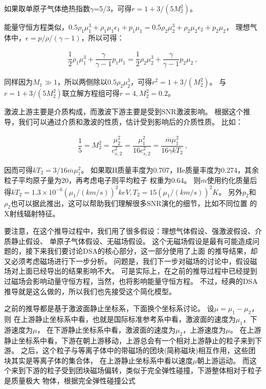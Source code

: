 如果取单原子气体绝热指数$\gamma$=5/3，可得$r=1+3/(5 M_{2}^{2})$。

能量守恒方程类似，$0.5\rho_1\mu_1^3+\rho_1\mu_1\epsilon_1+p_1\mu_1=
0.5\rho_2\mu_2^3+\rho_2\mu_2\epsilon_2+p_2\mu_2$，
理想气体中，$\epsilon=p/\rho/(\gamma-1)$，所以可得：

\begin{equation}
    \begin{aligned}
      \dfrac{1}{2}\rho_1\mu_1^3+\dfrac{\gamma}{\gamma-1}p_1\mu_1=
      \dfrac{1}{2}\rho_2\mu_2^3+\dfrac{\gamma}{\gamma-1}p_2\mu_2\ ,
    \end{aligned}
\end{equation}

同样因为$M_1\gg 1$，所以两侧除以$0.5\rho_2\mu_2^3$，可得$r^2=1+3/(M_{2}^{2})$。
与$r=1+3/(5 M_{2}^{2})$联立解方程组可得$r=4, M_{2}^{2}=0.2$。

激波上游主要是介质构成，而激波下游主要是受到SNR激波影响。
根据这个推导，我们可以通过介质和激波的性质，估计受到影响后的介质性质。
比如：

\begin{equation}
    \begin{aligned}
      \dfrac{1}{5}=M_{2}^{2}=\dfrac{\mu_{2}^{2}}{c_{s, 2}^{2}}=
      \dfrac{\mu_{1}^{2}}{16 c_{s, 2}^{2}}=\dfrac{\overline{m} \mu_{1}^{2}}{16 \gamma k T_{2}}\ ,
    \end{aligned}
\end{equation}

因而可得$k T_{2}=3/16 \overline{m} \mu_{1}^{2}$。
如果取H质量丰度为0.707，He质量丰度为0.274，其余粒子平均原子量为20，再考虑电子则平均粒子
权重为0.64。
则$\overline{m}$使用约化质量后得$k T_{2}=1.3 \times 10^{-6}(\mu_1/(km/s))^2 keV, T_2 =
15 (\mu_1/(km/s))^2 K$。
另外$p_2$和$\rho_2$也可以据此推出，这可以帮助我们理解很多SNR演化的细节，比如不同位置
的X射线辐射特征。

要注意，在这个推导过程中，我们用了很多假设：理想气体假设、强激波假设、介质静止假设、
单原子气体假设、无磁场假设。
这个无磁场假设是最有可能造成问题的，接下来我们要讨论DSA的核心部分，这一部分使用了上面
的推导结果，却又必须考虑磁场进行下一步分析。
问题是，我们下一步对磁场的讨论中，假设磁场对上面已经导出的结果影响不大。
可是实际上，在之前的推导过程中已经提到过磁场会影响动量守恒方程，当然，也将影响能量守恒方程。
不过，经典的DSA推导就是这么做的，所以我们也先接受这个简化模型。

之前的推导都是基于激波面静止坐标系，下面换个坐标系讨论。
设$\mu=\mu_1-\mu_2$，则
在上游静止坐标系中看，也就是国际标准参考系中看，激波面的速度为$\mu_1$，下游速度为$\mu$，
在下游静止坐标系中看，激波面的速度为$\mu_2$，上游速度为$\mu$。
在上游静止坐标系中看，下游在朝上游移动，上游总会有一个相对上游静止的粒子来到下游。
之后，这个粒子与等离子体中的带磁场的团块(简称磁块)相互作用，这些团块其实是等离子体的集合体，
在上游静止坐标系中看以速度$\mu$朝上游运动。
而这个来到下游的粒子受到团块磁场偏转，类似于完全弹性碰撞，下游整体相对于粒子是质量极大
物体，根据完全弹性碰撞公式


